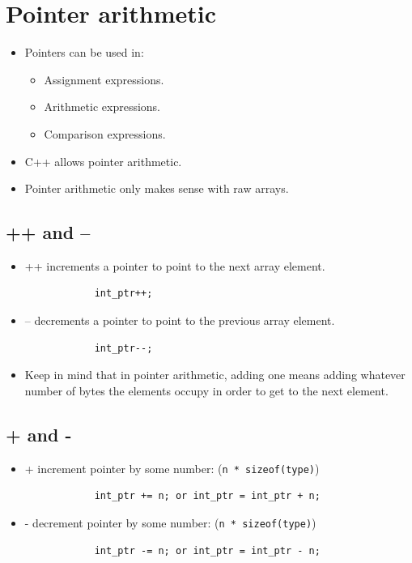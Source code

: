 \section{Pointer arithmetic}
\begin{itemize}
    \item Pointers can be used in:
        \begin{itemize}
            \item Assignment expressions.
            \item Arithmetic expressions.
            \item Comparison expressions.
        \end{itemize}
    
    \item C++ allows pointer arithmetic.
    \item Pointer arithmetic only makes sense with raw arrays.
\end{itemize}

\subsection{++ and --}
\begin{itemize}
    \item ++ increments a pointer to point to the next array element.
        \begin{verbatim}
            int_ptr++;
        \end{verbatim}
    \item -- decrements a pointer to point to the previous array element.
        \begin{verbatim}
            int_ptr--;
        \end{verbatim}
    
    \item Keep in mind that in pointer arithmetic, adding one means adding whatever number of bytes the elements occupy in order to get to the next element.
\end{itemize}

\subsection{+ and -}
\begin{itemize}
    \item + increment pointer by some number: (\texttt{n * sizeof(type)})
        \begin{verbatim}
            int_ptr += n; or int_ptr = int_ptr + n;
        \end{verbatim}
    
    \item - decrement pointer by some number: (\texttt{n * sizeof(type)})
        \begin{verbatim}
            int_ptr -= n; or int_ptr = int_ptr - n;
        \end{verbatim}
\end{itemize}

